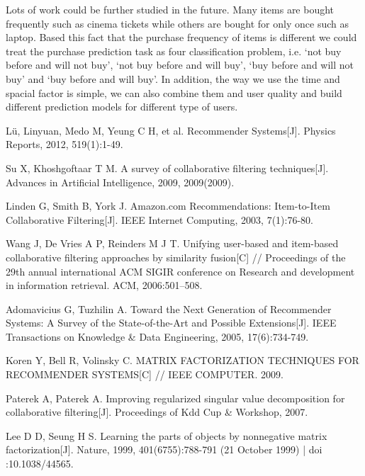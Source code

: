 \documentclass{llncs}
\begin{document}
Lots of work could be further studied in the future.
Many items are bought frequently such as cinema tickets
while others are bought for only once such as laptop.
Based this fact that the purchase frequency of items is different
we could treat the purchase prediction task
as four classification problem, i.e.
`not buy before and will not buy', `not buy before and will buy',
`buy before and will not buy' and `buy before and will buy'.
In addition, the way we use the time and spacial factor is simple,
we can also combine them and user quality
and build different prediction models for different type of users.

\begin{thebibliography}{12}
	
	Lü, Linyuan, Medo M, Yeung C H, et al. Recommender Systems[J]. Physics Reports, 2012, 519(1):1-49.
	
	Su X, Khoshgoftaar T M. A survey of collaborative filtering techniques[J]. Advances in Artificial Intelligence, 2009, 2009(2009).
	
	Linden G, Smith B, York J. Amazon.com Recommendations: Item-to-Item Collaborative Filtering[J]. IEEE Internet Computing, 2003, 7(1):76-80.
	
	Wang J, De Vries A P, Reinders M J T. Unifying user-based and item-based collaborative filtering approaches by similarity fusion[C]
	// Proceedings of the 29th annual international ACM SIGIR conference on Research and development in information retrieval. ACM, 2006:501--508.
	
	Adomavicius G, Tuzhilin A. Toward the Next Generation of Recommender Systems: A Survey of the State-of-the-Art and Possible Extensions[J].
	IEEE Transactions on Knowledge \& Data Engineering, 2005, 17(6):734-749.
	
	Koren Y, Bell R, Volinsky C. MATRIX FACTORIZATION TECHNIQUES FOR RECOMMENDER SYSTEMS[C]
	// IEEE COMPUTER. 2009.
	
	Paterek A, Paterek A. Improving regularized singular value decomposition for collaborative filtering[J]. Proceedings of Kdd Cup \& Workshop, 2007.
	
	Lee D D, Seung H S. Learning the parts of objects by nonnegative matrix factorization[J]. Nature, 1999, 401(6755):788-791 (21 October 1999) | doi :10.1038/44565.
	

\end{thebibliography}
\end{document}
